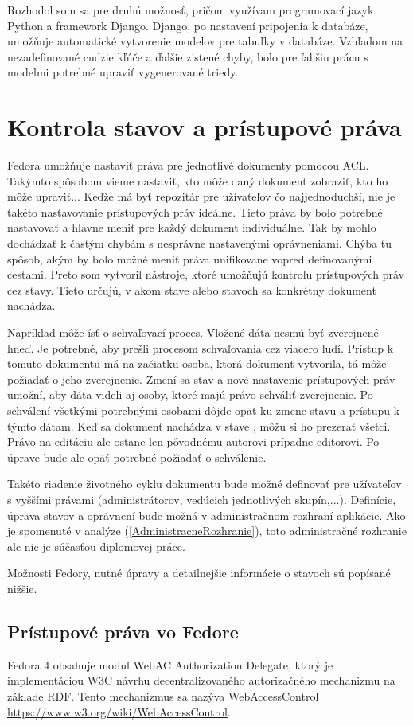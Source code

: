 \documentclass[thesis=M,slovak]{FITthesis}[2013/05/06]
\begin{document}
Rozhodol som sa pre druhú možnosť, pričom využívam programovací jazyk Python a framework Django. Django, po nastavení pripojenia k databáze, umožňuje automatické vytvorenie modelov pre tabuľky v databáze. Vzhľadom na nezadefinované cudzie kľúče a ďalšie zistené chyby, bolo pre ľahšiu prácu s modelmi potrebné upraviť vygenerované triedy.

\section{Kontrola stavov a prístupové práva} \label{stavy}
Fedora umožňuje nastaviť práva pre jednotlivé dokumenty pomocou ACL. Takýmto spôsobom vieme nastaviť, kto môže daný dokument zobraziť, kto ho môže upraviť... Keďže má byť repozitár pre užívateľov čo najjednoduchší, nie je takéto nastavovanie prístupových práv ideálne. Tieto práva by bolo potrebné nastavovať a hlavne meniť pre každý dokument individuálne. Tak by mohlo dochádzať k častým chybám s nesprávne nastavenými oprávneniami. Chýba tu spôsob, akým by bolo možné meniť práva unifikovane vopred definovanými cestami. Preto som vytvoril nástroje, ktoré umožňujú kontrolu prístupových práv cez stavy. Tieto určujú, v akom stave alebo stavoch sa konkrétny dokument nachádza.

Napríklad môže ísť o schvaľovací proces. Vložené dáta nesmú byť zverejnené hneď. Je potrebné, aby prešli procesom schvaľovania cez viacero ľudí. Prístup k tomuto dokumentu má na začiatku osoba, ktorá dokument vytvorila, tá môže požiadať o jeho zverejnenie. Zmení sa stav a nové nastavenie prístupových práv umožní, aby dáta videli aj osoby, ktoré majú právo schváliť zverejnenie. Po schválení všetkými potrebnými osobami dôjde opäť ku zmene stavu a prístupu k týmto dátam. Keď sa dokument nachádza v stave , môžu si ho prezerať všetci. Právo na editáciu ale ostane len pôvodnému autorovi prípadne editorovi. Po úprave bude ale opäť potrebné požiadať o schválenie.

Takéto riadenie životného cyklu dokumentu bude možné definovať pre užívateľov s vyššími právami (administrátorov, vedúcich jednotlivých skupín,...). Definície, úprava stavov a oprávnení bude možná v administračnom rozhraní aplikácie. Ako je spomenuté v analýze (\ref{AdministracneRozhranie}), toto administračné rozhranie ale nie je súčasťou diplomovej práce.

Možnosti Fedory, nutné úpravy a detailnejšie informácie o stavoch sú popísané nižšie.

\subsection{Prístupové práva vo Fedore}
Fedora 4 obsahuje modul WebAC Authorization Delegate, ktorý je implementáciou W3C návrhu decentralizovaného autorizačného mechanizmu na základe RDF. Tento mechanizmus sa nazýva WebAccessControl \url{https://www.w3.org/wiki/WebAccessControl}.
\end{document}
